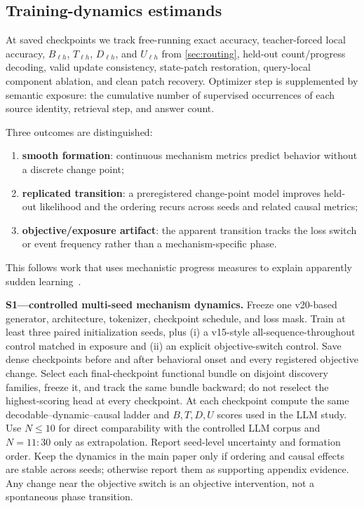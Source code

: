 \subsection{Training-dynamics estimands}

At saved checkpoints we track free-running exact accuracy, teacher-forced local
accuracy, \(B_{\ell h}\), \(T_{\ell h}\), \(D_{\ell h}\), and \(U_{\ell h}\) from
\cref{sec:routing}, held-out count/progress decoding, valid update
consistency, state-patch restoration, query-local component ablation, and clean
patch recovery. Optimizer step is supplemented by semantic exposure: the
cumulative number of supervised occurrences of each source identity,
retrieval step, and answer count.

Three outcomes are distinguished:
\begin{enumerate}
  \item \textbf{smooth formation}: continuous mechanism metrics predict behavior without a discrete change point;
  \item \textbf{replicated transition}: a preregistered change-point model improves held-out likelihood and the ordering recurs across seeds and related causal metrics;
  \item \textbf{objective/exposure artifact}: the apparent transition tracks the loss switch or event frequency rather than a mechanism-specific phase.
\end{enumerate}
This follows work that uses mechanistic progress measures to explain apparently sudden learning~\citep{nanda2023grokking,olsson2022induction}.

\begin{todobox}
\textbf{S1---controlled multi-seed mechanism dynamics.}
Freeze one v20-based generator, architecture, tokenizer, checkpoint schedule,
and loss mask. Train at least three paired initialization seeds, plus (i) a
v15-style all-sequence-throughout control matched in exposure and (ii) an
explicit objective-switch control. Save dense checkpoints before and after
behavioral onset and every registered objective change. Select each
final-checkpoint functional bundle on disjoint discovery families, freeze it,
and track the same bundle backward; do not reselect the highest-scoring head
at every checkpoint. At each checkpoint compute the same
decodable--dynamic--causal ladder and \(B,T,D,U\) scores used in the LLM
study. Use \(N\leq10\) for direct comparability with the controlled LLM corpus
and \(N=11{:}30\) only as extrapolation. Report seed-level uncertainty and
formation order. Keep the dynamics in the main paper only if ordering and
causal effects are stable across seeds; otherwise report them as supporting
appendix evidence. Any change near the objective switch is an objective
intervention, not a spontaneous phase transition.
\end{todobox}


